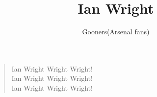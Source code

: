 \documentclass[a4paper,12pt]{article}
\title{Ian Wright}
\author{Gooners(Arsenal fans)}
\date{}
\begin{document}
	
	\maketitle
	
	\begin{verse}
		
		Ian Wright Wright Wright! \\
		Ian Wright Wright Wright! \\
		Ian Wright Wright Wright!
		
	\end{verse}
	
\end{document}
